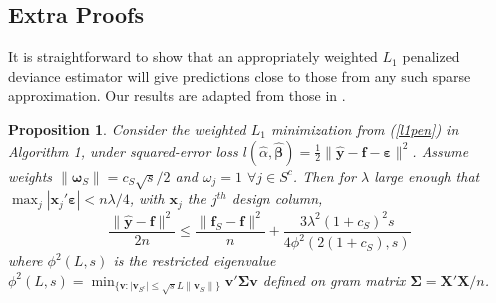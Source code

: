 \documentclass[12pt]{article}
\newtheorem{prop}{\sc Proposition}[section]
\newcommand{\bs}[1]{\boldsymbol{#1}}
\newcommand{\bm}[1]{\mathbf{#1}}
\begin{document}
\subsection{Extra Proofs}

It is
straightforward to show that an appropriately weighted $L_1$ penalized
deviance estimator will give predictions close to those from any such sparse
approximation.  Our results are adapted from those in
\citet{van_de_geer_adaptive_2011}.


\begin{prop} Consider the weighted $L_1$ minimization from (\ref{l1pen}) in
Algorithm 1, under squared-error loss $l(\hat\alpha,\bs{\hat\beta}) =
\frac{1}{2}\|\bm{\hat y} - \bm{f} - \bs{\varepsilon}\|^2$.   Assume weights
$\|\bs{\omega}_S\| = c_S\sqrt{s}/2$ and $\omega_j = 1$ $\forall j \in S^c$.
Then for $\lambda$ large enough that $\max_j |\bs{x}_j'\bs{\varepsilon}| <
n\lambda/4$, with $\bs{x}_j$ the $j^{th}$ design column, 
\begin{equation} \frac{\|\bm{\hat y} - \bm{f}\|^2}{2n}\leq
\frac{\|\bm{f}_S-\bm{f}\|^2}{n} +  \frac{3\lambda^2 (1+c_S)^2 s}{4\phi^2(2(1+c_S), s)}
\end{equation} 
where $\phi^2(L,s)$ is the restricted eigenvalue
$
\phi^2(L,s) = \min_{\{\bm{v}: |\bm{v}_{S^c}| \leq \sqrt{s}L\|\bm{v}_S\|\}}\bm{v}'\bs{\Sigma}\bm{v}
$ defined on gram matrix $\bs{\Sigma} = \bm{X}'\bm{X}/n$.
\end{prop}
\end{document}

